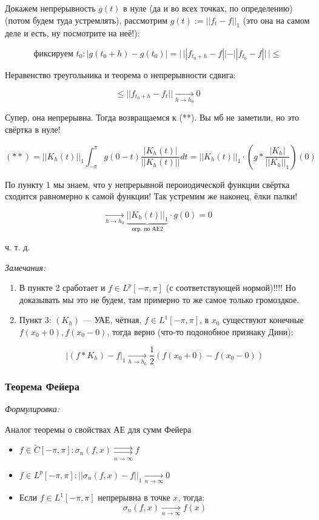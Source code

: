 \documentclass{article}
\def\rsh#1{\underset{#1}{\rightrightarrows}}
\def\goesto#1{\underset{#1}{\longrightarrow}}
\def\toinf#1{\goesto{#1 \rightarrow \infty}}
\def\ntoinf{\toinf{n}}
\begin{document}
Докажем непрерывность $g(t)$ в нуле (да и во всех точках, по определению) (потом будем туда устремлять), рассмотрим $g(t) := ||f_t - f||_1$ (это она на самом деле и есть, ну посмотрите на неё!):

\[\text{фиксируем } t_0: |g(t_0 + h) - g(t_0)| = | \,||f_{t_0 + h} - f|| - ||f_{t_0} - f|| \,| \le \]

Неравенство треугольника и теорема о непрерывности сдвига:

\[\le ||f_{t_0 + h} - f_t|| \goesto{h \rightarrow h_0} 0\]

Супер, она непрерывна. Тогда возвращаемся к (**). Вы мб не заметили, но это свёртка в нуле!

\[ (**) = ||K_h(t)||_1\int_{-\pi}^{\pi} g(0 - t) \frac{|K_h(t)|}{||K_h(t)||}dt = ||K_h(t)||_1 \cdot \left(g * \frac{|K_h|}{||K_h||_1}\right)(0)\]

По пункту 1 мы знаем, что у непрерывной пероиодической функции свёртка сходится равномерно к самой функции! Так устремим же наконец, ёлки палки!

\[\goesto{h \rightarrow h_0} \underbrace{||K_h(t)||_1}_{\text{огр. по АЕ2}} \cdot g(0) = 0\]

ч. т. д.

\textit{Замечания:} 

\begin{enumerate}
    \item В пункте 2 сработает и $f \in L^p[-\pi, \pi]$ (с соответствующей нормой)!!!! Но доказывать мы это не будем, там примерно то же самое только громоздкое.
    \item Пункт 3: $(K_h)$ --- УАЕ, чётная, $f \in L^1[-\pi, \pi]$, в $x_0$ существуют конечные $f(x_0 + 0), f(x_0  - 0)$, тогда верно (что-то подонобное признаку Дини):
    
    \[|(f * K_h) - f|_1 \goesto{h \rightarrow h_0} \frac{1}{2}(f(x_0 + 0) - f(x_0 - 0))\]
\end{enumerate}

\subsubsection{Теорема Фейера }
\textit{Формулировка:}

Аналог теоремы о свойствах АЕ для сумм Фейера

\begin{itemize}
    \item $f \in \tilde{C}[-\pi, \pi]: \sigma_n(f, x) \rsh{n \rightarrow \infty} f$
    \item $f \in L^p[-\pi, \pi]: ||\sigma_n(f, x) - f||_1 \ntoinf 0$
    \item Если $f \in L^1[-\pi, \pi]$ непрерывна в точке $x$, тогда:
    \[\sigma_n(f, x) \ntoinf f(x)\]
\end{itemize}
\end{document}
